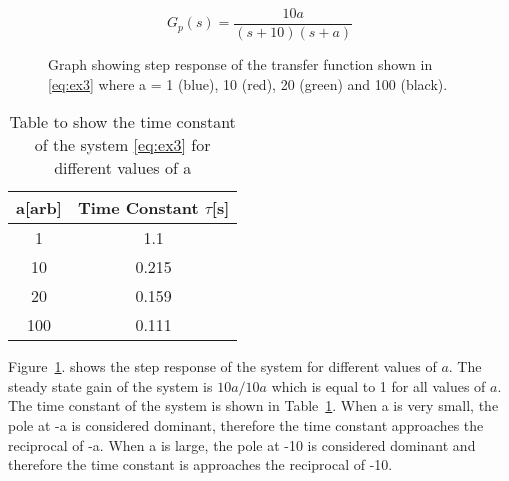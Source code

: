 \renewcommand{\ex}{ex3}

\begin{equation}
	G_{p}\left(s\right)=\frac{10a}{\left(s+10\right)\left(s+a\right)}
	\label{eq:\ex}
\end{equation}

\begin{figure}[ht!]
	\centering
	
	\caption{Graph showing step response of the transfer function shown in \eqref{eq:\ex} where a = 1 (blue), 10 (red), 20 (green) and 100 (black).\appendixamble{\ex}}
	\label{fig:\ex}
\end{figure}\FloatBarrier


\begin{table}[ht!]
	\centering
	\begin{tabular}{|c|c|}
		\hline
		a{[}arb{]} & Time Constant $\tau${[}s{]} \\ \hline
		1          & 1.1                         \\ \hline
		10         & 0.215                       \\ \hline
		20         & 0.159                       \\ \hline
		100        & 0.111                       \\ \hline
	\end{tabular}
    \caption{Table to show the time constant of the system \eqref{eq:\ex} for different values of a}\label{table:\ex}
\end{table}\FloatBarrier

Figure~\ref{fig:\ex}. shows the step response of the system for different values of $a$. The steady state gain of the system is $10a/10a$ which is equal to 1 for all values of $a$. The time constant of the system is shown in Table~\ref{table:\ex}. When a is very small, the pole at -a is considered dominant, therefore the time constant approaches the reciprocal of -a. When a is large, the pole at -10 is considered dominant and therefore the time constant is approaches the reciprocal of -10. \\

